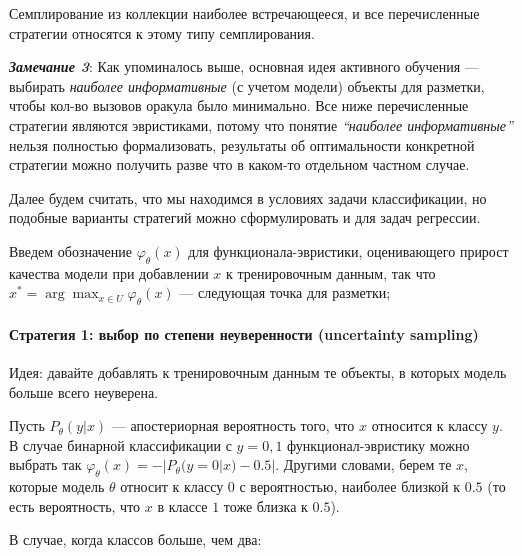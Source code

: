 \documentclass[]{article}
\let\oldparagraph\paragraph
\renewcommand{\paragraph}[1]{\oldparagraph{#1}\mbox{}}
\begin{document}
Семплирование из коллекции наиболее встречающееся, и все перечисленные
стратегии относятся к этому типу семплирования.

\emph{\textbf{Замечание 3}}: Как упоминалось выше, основная идея
активного обучения --- выбирать \emph{наиболее информативные} (с учетом
модели) объекты для разметки, чтобы кол-во вызовов оракула было
минимально. Все ниже перечисленные стратегии являются эвристиками,
потому что понятие \emph{``наиболее информативные''} нельзя полностью
формализовать, результаты об оптимальности конкретной стратегии можно
получить разве что в каком-то отдельном частном случае.

Далее будем считать, что мы находимся в условиях задачи классификации,
но подобные варианты стратегий можно сформулировать и для задач
регрессии.

Введем обозначение \(\varphi_{\theta}(x)\) для функционала-эвристики,
оценивающего прирост качества модели при добавлении \(x\) к
тренировочным данным, так что
\(x^* = \arg\max_{x \in U} \varphi_{\theta}(x)\) --- следующая точка для
разметки;

\paragraph{Стратегия 1: выбор по степени неуверенности (uncertainty
sampling)}\label{ux441ux442ux440ux430ux442ux435ux433ux438ux44f-1-ux432ux44bux431ux43eux440-ux43fux43e-ux441ux442ux435ux43fux435ux43dux438-ux43dux435ux443ux432ux435ux440ux435ux43dux43dux43eux441ux442ux438-uncertainty-sampling}

Идея: давайте добавлять к тренировочным данным те объекты, в которых
модель больше всего неуверена.

Пусть \(P_{\theta}(y|x)\) --- апостериорная вероятность того, что \(x\)
относится к классу \(y\). В случае бинарной классификации с \(y = 0, 1\)
функционал-эвристику можно выбрать так
\(\varphi_{\theta}(x) = -|P_{\theta}(y = 0|x) - 0.5|\). Другими словами,
берем те \(x\), которые модель \(\theta\) относит к классу \(0\) с
вероятностью, наиболее близкой к \(0.5\) (то есть вероятность, что \(x\)
в классе \(1\) тоже близка к \(0.5\)).

В случае, когда классов больше, чем два:
\end{document}
